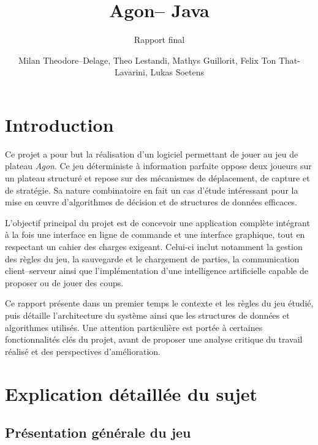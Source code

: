\documentclass[a4paper]{article}
\title{Agon-- Java}
\subtitle{Rapport final}
\author{Milan Theodore--Delage, Theo Lestandi, Mathys Guillorit, Felix Ton That-Lavarini, Lukas Soetens}
\begin{document}

\maketitle
\thispagestyle{empty}


\section*{Introduction}

Ce projet a pour but la réalisation d’un logiciel permettant de jouer au jeu de plateau \textit{Agon}. Ce jeu déterministe à information parfaite oppose deux joueurs sur un plateau structuré et repose sur des mécanismes de déplacement, de capture et de stratégie. Sa nature combinatoire en fait un cas d’étude intéressant pour la mise en œuvre d’algorithmes de décision et de structures de données efficaces.

L’objectif principal du projet est de concevoir une application complète intégrant à la fois une interface en ligne de commande et une interface graphique, tout en respectant un cahier des charges exigeant. Celui-ci inclut notamment la gestion des règles du jeu, la sauvegarde et le chargement de parties, la communication client--serveur ainsi que l’implémentation d’une intelligence artificielle capable de proposer ou de jouer des coups.

Ce rapport présente dans un premier temps le contexte et les règles du jeu étudié, puis détaille l’architecture du système ainsi que les structures de données et algorithmes utilisés. Une attention particulière est portée à certaines fonctionnalités clés du projet, avant de proposer une analyse critique du travail réalisé et des perspectives d’amélioration.

\section{Explication détaillée du sujet}

\subsection{Présentation générale du jeu}
\end{document}
